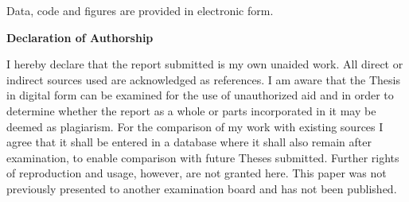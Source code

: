 \documentclass[12pt]{article}
\begin{document}
Data, code and figures are provided in electronic form.

\newpage
    

\RaggedRight


\newpage


\Large
\noindent
\textbf{Declaration of Authorship} 
\vspace{0.5cm}
\noindent
\normalsize

I hereby declare that the report submitted is my own unaided work. All direct or 
indirect sources used are acknowledged as references. I am aware that the Thesis 
in digital form can be examined for the use of unauthorized aid and in order to 
determine whether the report as a whole or parts incorporated in it may be 
deemed as plagiarism. For the comparison of my work with existing sources I 
agree that it shall be entered in a database where it shall also remain after 
examination, to enable comparison with future Theses submitted. Further rights 
of reproduction and usage, however, are not granted here. This paper was not 
previously presented to another examination board and has not been published. 

\end{document}
